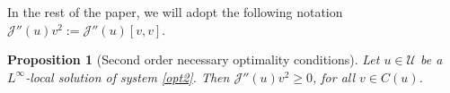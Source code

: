 \documentclass[reqno,twoside]{amsart}
\numberwithin{equation}{section}
\newtheorem{proposition}[theorem]{Proposition}
\theoremstyle{definition}
\newtheorem{remark}[theorem]{Remark}
\numberwithin{equation}{section}
\begin{document}
In the rest of the paper, we will adopt the following notation $\mathcal{J}''(u)v^2:=\mathcal{J}''(u)[v,v]$.

\begin{proposition}[Second order necessary optimality conditions]
Let $u\in \mathcal{U}$ be a $L^\infty$-local solution of system \eqref{opt2}. Then $\mathcal{J}''(u)v^2\geq 0$, for all $v\in C(u)$.
\end{proposition}
\end{document}
